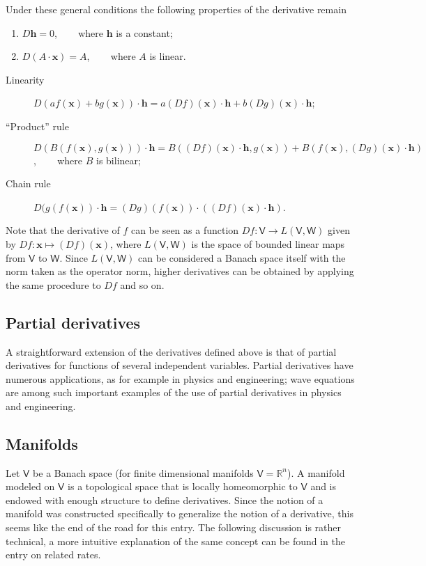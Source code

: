\documentclass[12pt]{article}
\def\R{{\mathbb R}}
\def\V{{\mathsf V}}
\def\W{{\mathsf W}}
\def\x{{\mathbf x}}
\def\h{{\mathbf h}}
\begin{document}
	Under these general conditions the following properties of the
	derivative remain
	\begin{enumerate}
	\item $D\h = 0$, ~~~ where $\h$ is a constant;
	\item $D(A\cdot\x) = A$, ~~~ where $A$ is linear.
	\end{enumerate}
	\begin{description}
	\item[Linearity] $D(af(\x)+bg(\x))\cdot\h =
		a(Df)(\x)\cdot\h+b(Dg)(\x)\cdot\h$;
	\item[``Product'' rule] $D(B(f(\x),g(\x)))\cdot\h =
		B((Df)(\x)\cdot\h,g(\x)) + B(f(\x),(Dg)(\x)\cdot\h)$,
		~~~ where $B$ is bilinear;
	\item[Chain rule] $D(g(f(\x))\cdot\h =
		(Dg)(f(\x))\cdot((Df)(\x)\cdot\h)$.
	\end{description}

	Note that the derivative of $f$ can be seen as a function $Df\colon
	\V\to L(\V,\W)$ given by $Df\colon\x\mapsto(Df)(\x)$, where $L(\V,\W)$
	is the space of bounded linear maps from $\V$ to $\W$. Since $L(\V,\W)$
	can be considered a Banach space itself with the norm taken as the
	operator norm, higher derivatives can be
	obtained by applying the same procedure to $Df$ and so on.

\subsection{Partial derivatives}
A straightforward extension of the derivatives defined above is that of partial derivatives for functions
of several independent variables. Partial derivatives have numerous applications, as for example in
physics and engineering; wave equations are among such important examples of the use of partial derivatives
in physics and engineering. 

\subsection*{Manifolds}
	Let $\V$ be a Banach space (for finite dimensional manifolds $\V=\R^n$). A manifold modeled on $\V$ is a topological space that is locally homeomorphic to
	$\V$  and
	is endowed with enough structure to define derivatives. Since the
	notion of a manifold was constructed specifically to generalize the
	notion of a derivative, this seems like the end of the road for this
	entry. The following discussion is rather technical, a more
	intuitive explanation of the same concept can be found in the entry
	on related rates.
\end{document}

